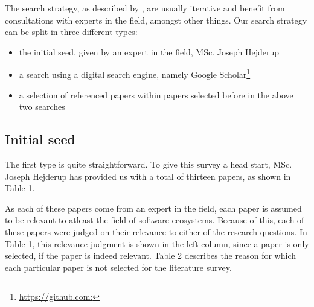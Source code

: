 \documentclass[]{book}
\providecommand{\tightlist}{%
  \setlength{\itemsep}{0pt}\setlength{\parskip}{0pt}}
\let\rmarkdownfootnote\footnote%
\def\footnote{\protect\rmarkdownfootnote}
\begin{document}
The search strategy, as described by \citet{Kitchenham2004}, are usually
iterative and benefit from consultations with experts in the field,
amongst other things. Our search strategy can be split in three
different types:

\begin{itemize}
\tightlist
\item
  the initial seed, given by an expert in the field, MSc. Joseph
  Hejderup
\item
  a search using a digital search engine, namely Google
  Scholar\footnote{\url{https://github.com:}}
\item
  a selection of referenced papers within papers selected before in the
  above two searches
\end{itemize}

\subsection{Initial seed}\label{initial-seed}

The first type is quite straightforward. To give this survey a head
start, MSc. Joseph Hejderup has provided us with a total of thirteen
papers, as shown in Table 1.

As each of these papers come from an expert in the field, each paper is
assumed to be relevant to atleast the field of software ecosystems.
Because of this, each of these papers were judged on their relevance to
either of the research questions. In Table 1, this relevance judgment is
shown in the left column, since a paper is only selected, if the paper
is indeed relevant. Table 2 describes the reason for which each
particular paper is not selected for the literature survey.
\end{document}
